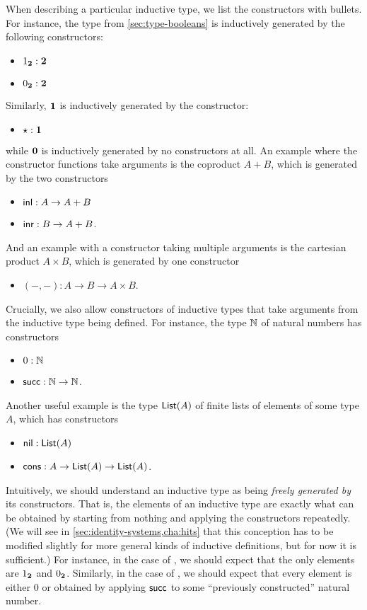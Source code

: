 When describing a particular inductive type, we list the constructors with bullets.
For instance, the type \bool from \autoref{sec:type-booleans} is inductively generated by the following constructors:
\begin{itemize}
\item ${1_{\mathbf{2}}}:\mathbf{2}$
\item ${0_{\mathbf{2}}}:\mathbf{2}$
\end{itemize}
Similarly, $\mathbf{1}$ is inductively generated by the constructor:
\begin{itemize}
\item $\star:\mathbf{1}$
\end{itemize}
while $\mathbf{0}$ is inductively generated by no constructors at all.
An example where the constructor functions take arguments is the coproduct $A+B$, which is generated by the two constructors
\begin{itemize}
\item ${\mathsf{inl}}:A\to A+B$
\item ${\mathsf{inr}}:B\to A+B$.
\end{itemize}
And an example with a constructor taking multiple arguments is the cartesian product $A\times B$, which is generated by one constructor
\begin{itemize}
\item $(-,-) : A\to B \to A\times B$.
\end{itemize}
Crucially, we also allow constructors of inductive types that take arguments from the inductive type being defined.
For instance, the type $\mathbb{N}$ of natural numbers has constructors
\begin{itemize}
\item $0:\mathbb{N}$
\item $\mathsf{succ}:\mathbb{N}\to\mathbb{N}$.
\end{itemize}
Another useful example is the type $\mathsf{List}(A)$ of finite lists of elements of some type $A$, which has constructors
\begin{itemize}
\item $\mathsf{nil}:\mathsf{List}(A)$
\item $\mathsf{cons}:A\to \mathsf{List}(A) \to \mathsf{List}(A)$.
\end{itemize}

Intuitively, we should understand an inductive type as being \emph{freely generated by} its constructors.
That is, the elements of an inductive type are exactly what can be obtained by starting from nothing and applying the constructors repeatedly.
(We will see in \autoref{sec:identity-systems,cha:hits} that this conception has to be modified slightly for more general kinds of inductive definitions, but for now it is sufficient.)
For instance, in the case of \bool, we should expect that the only elements are ${1_{\mathbf{2}}}$ and ${0_{\mathbf{2}}}$.
Similarly, in the case of \nat, we should expect that every element is either $0$ or obtained by applying $\mathsf{succ}$ to some ``previously constructed'' natural number.

